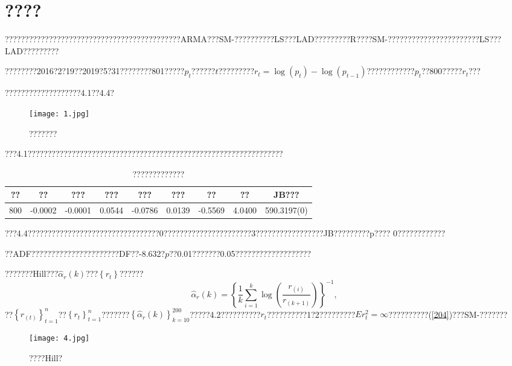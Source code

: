 \documentclass[a4paper,12pt,openany,oneside,utf-8]{ctexbook}
\begin{document}
	
	\section{????}
	
	????????????????????????????????????????????ARMA???SM-??????????LS???LAD?????????R????SM-???????????????????????LS???LAD?????????
	
	????????2016?2?19??2019?5?31????????801?????$p_t$??????$t$?????????$r_t=\log(p_t)-\log(p_{t-1})$????????????$p_t$??800?????$r_t$???
	
	???????????????????4.1??4.4?
	
	\begin{figure}[htb]
		\centering
		\texttt{[image: 1.jpg]}
		\caption{???????}
	\end{figure}
	
	???4.1????????????????????????????????????????????????????????????????
	
	\begin{center}
		\begin{table}[htb]
			\linespread{1.5}
			\begin{center}
				\caption{?????????????}
				\small{\begin{tabular}{ccccccccc}
						\hline ?? & ?? & ??? & ??? & ??? & ??? & ?? & ?? & JB??? \\
						\hline  800 &  -0.0002 &  -0.0001 & 0.0544 & -0.0786 & 0.0139 &  -0.5569 & 4.0400 & 590.3197(0)\\
						\hline
				\end{tabular}}
				\label{tab:size}
			\end{center}
		\end{table}
	\end{center}
	
	???4.4?????????????????????????????????0??????????????????????3?????????????????JB?????????p???? 0????????????
	
	??ADF??????????????????????DF??-8.632?$p$??0.01???????0.05???????????????????
	
	???????Hill???$\hat{\alpha}_{r}(k)$???$\left\{r_t\right\}$??????$$\hat{\alpha}_{r}(k)=\left\{\frac{1}{k} \sum_{i=1}^{k} \log \left(\frac{r_{(i)}}{r_{(k+1)}}\right)\right\}^{-1},$$
	??$\left\{r_{(t)}\right\}_{t=1}^{n}$??$\left\{r_{t}\right\}_{t=1}^{n}$???????$\left\{\hat{\alpha}_{r}(k)\right\}_{k=10}^{200}$?????4.2??????????$r_t$??????????1?2?????????$E r_{t}^{2}=\infty$??????????(\ref{204})???SM-???????
	
	\begin{figure}[htb]
		\centering
		\texttt{[image: 4.jpg]}
		\caption{????Hill?}
	\end{figure}
	
\end{document}
